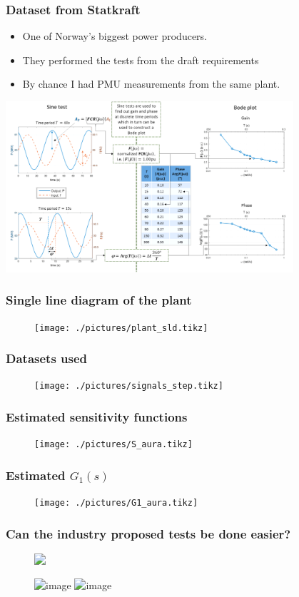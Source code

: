 \begin{frame}
	\frametitle{Dataset from Statkraft}
	\begin{itemize}[<+->]
		\item One of Norway's biggest power producers.
		\item They performed the tests from the draft requirements
		\item By chance I had PMU measurements from the same plant.
		\end{itemize}
		\includegraphics[width=0.8\textwidth]{./pictures/tests.png}
\end{frame}
\begin{frame}
	\frametitle{Single line diagram of the plant}
	\begin{figure}
		\texttt{[image: ./pictures/plant\_sld.tikz]}
	\end{figure}
\end{frame}
\begin{frame}
	\frametitle{Datasets used}
	\begin{figure}
			\texttt{[image: ./pictures/signals\_step.tikz]}
	\end{figure}
\end{frame}
\begin{frame}
	\frametitle{Estimated sensitivity functions}
		\begin{figure}[tb]
			\texttt{[image: ./pictures/S\_aura.tikz]}
		\end{figure}
\end{frame}
\begin{frame}
	\frametitle{Estimated $G_1(s)$}
		\begin{figure}[tb]
			\texttt{[image: ./pictures/G1\_aura.tikz]}
		\end{figure}
\end{frame}
\begin{frame}
	\frametitle{Can the industry proposed tests be done easier?}
	\begin{figure}
		\includegraphics<1->[width=0.6\textwidth]{./pictures/aura_signals.tikz}
	\end{figure}
	\begin{figure}
		\includegraphics<1>[width=0.6\textwidth]{./pictures/frd.tikz}
		\includegraphics<2>[width=0.6\textwidth]{./pictures/frd_vs_bj.tikz}
	\end{figure}
\end{frame}
